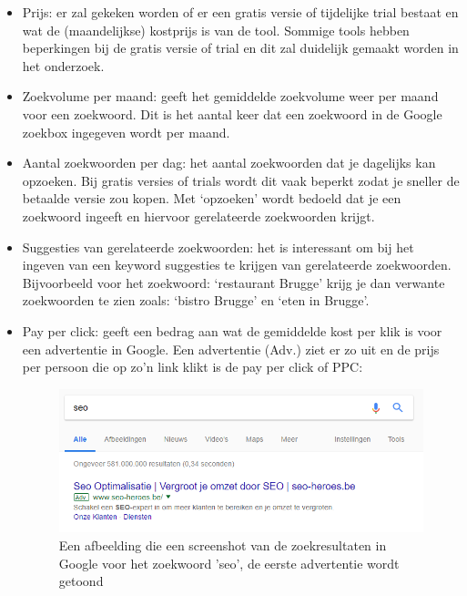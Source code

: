\begin{itemize}
\item Prijs: er zal gekeken worden of er een gratis versie of tijdelijke trial bestaat en wat de (maandelijkse) kostprijs is van de tool. Sommige tools hebben beperkingen bij de gratis versie of trial en dit zal duidelijk gemaakt worden in het onderzoek. 
\item Zoekvolume per maand: geeft het gemiddelde zoekvolume weer per maand voor een zoekwoord. Dit is het aantal keer dat een zoekwoord in de Google zoekbox ingegeven wordt per maand.
\item Aantal zoekwoorden per dag: het aantal zoekwoorden dat je dagelijks kan opzoeken. Bij gratis versies of trials wordt dit vaak beperkt zodat je sneller de betaalde versie zou kopen. Met ‘opzoeken’ wordt bedoeld dat je een zoekwoord ingeeft en hiervoor gerelateerde zoekwoorden krijgt.
\item Suggesties van gerelateerde zoekwoorden: het is interessant om bij het ingeven van een keyword suggesties te krijgen van gerelateerde zoekwoorden. Bijvoorbeeld voor het zoekwoord: ‘restaurant Brugge’ krijg je dan verwante zoekwoorden te zien zoals: ‘bistro Brugge’ en ‘eten in Brugge’.
\item Pay per click: geeft een bedrag aan wat de gemiddelde kost per klik is voor een advertentie in Google. Een advertentie (Adv.) ziet er zo uit en de prijs per persoon die op zo’n link klikt is de pay per click of PPC: 

\begin{figure}[h!]
\centering
\includegraphics[width=\linewidth]{img/Adwordsvoorbeeld.png}
\caption{Een afbeelding die een screenshot van de zoekresultaten in Google voor het zoekwoord 'seo', de eerste advertentie wordt getoond \autocite{google.be}}
\end{figure}


\end{itemize}
